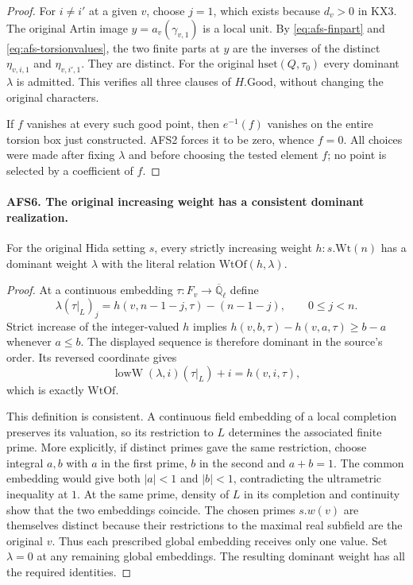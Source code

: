 \begin{proof}
For $i\ne i'$ at a given $v$, choose $j=1$, which exists
because $d_v>0$ in KX3.  The original Artin image
$y=a_v(\gamma_{v,1})$ is a local unit.  By
\eqref{eq:afs-finpart} and \eqref{eq:afs-torsionvalues}, the
two finite parts at $y$ are the inverses of the distinct
$\eta_{v,i,1}$ and $\eta_{v,i',1}$.  They are distinct.
For the original $\mathrm{hset}(Q,\tau_0)$ every dominant
$\lambda$ is admitted.  This verifies all three clauses of
$H.\mathrm{Good}$, without changing the original characters.

If $f$ vanishes at every such good point, then $e^{-1}(f)$
vanishes on the entire torsion box just constructed.  AFS2
forces it to be zero, whence $f=0$.  All choices were made
after fixing $\lambda$ and before choosing the tested element
$f$; no point is selected by a coefficient of $f$.
\end{proof}

\paragraph{AFS6. The original increasing weight has a consistent dominant realization.}
\label{claim:AFS6}
For the original Hida setting $s$, every strictly increasing
weight $h:s.\mathrm{Wt}(n)$ has a dominant weight $\lambda$
with the literal relation $\mathrm{WtOf}(h,\lambda)$.
\begin{proof}
At a continuous embedding $\tau:F_v\to\overline{\mathbb Q}_\ell$
define
\[
 \lambda(\tau|_L)_j=h(v,n-1-j,\tau)-(n-1-j),
                      \qquad 0\leq j<n.
\]
Strict increase of the integer-valued $h$ implies
$h(v,b,\tau)-h(v,a,\tau)\geq b-a$ whenever $a\leq b$.
The displayed sequence is therefore dominant in the source's
order.  Its reversed coordinate gives
\[
 \operatorname{lowW}(\lambda,i)(\tau|_L)+i=h(v,i,\tau),
\]
which is exactly $\mathrm{WtOf}$.

This definition is consistent.  A continuous field embedding
of a local completion preserves its valuation, so its
restriction to $L$ determines the associated finite prime.
More explicitly, if distinct primes gave the same restriction,
choose integral $a,b$ with $a$ in the first prime, $b$ in the
second and $a+b=1$.  The common embedding would give both
$|a|<1$ and $|b|<1$, contradicting the ultrametric inequality
at $1$.  At the same prime, density of $L$ in its completion
and continuity show that the two embeddings coincide.  The
chosen primes $s.w(v)$ are themselves distinct because their
restrictions to the maximal real subfield are the original
$v$.  Thus each prescribed global embedding receives only
one value.  Set $\lambda=0$ at any remaining global embeddings.
The resulting dominant weight has all the required identities.
\end{proof}

